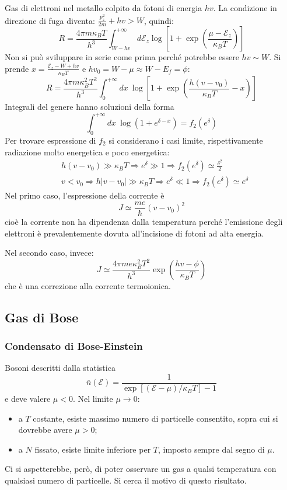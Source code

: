 \documentclass[10pt, a4paper]{scrartcl}
\numberwithin{equation}{subsection}
\theoremstyle{style1}
\begin{document}
Gas di elettroni nel metallo colpito da fotoni di energia $hv$. La condizione in direzione di fuga diventa: $\frac{p^2_z}{2m} + hv > W$, quindi:
\[
R = \frac{4 \pi m \kappa _B T}{h^3} \int_{W- hv} ^{+\infty}  d \mathscr{E}_z \log \left[ 1 + \exp \left(\frac{\mu - \mathscr{E}_z}{\kappa _B T}\right)  \right] 
\] 
Non si pu\`o sviluppare in serie come prima perch\'e potrebbe essere $hv \sim W$. Si prende $x = \frac{\mathscr{E}_z - W + hv}{\kappa _B T}$ e $hv_0 = W - \mu  \approx W - E_f = \phi $:
\[
R = \frac{4 \pi m \kappa _B^2 T^2}{h^3}  \int_{0} ^{+\infty} dx \ \log \left[ 1+ \exp \left(\frac{h(v-v_0)}{\kappa _B T} - x\right)  \right] 
\] 
Integrali del genere hanno soluzioni della forma
\[
\int_{0} ^{+\infty} dx \ \log \left(1 + e ^{ \delta  - x } \right) = f_2 (e^\delta )
\] 
Per trovare espressione di $f_2$ si considerano i casi limite, rispettivamente radiazione molto energetica e poco energetica:
\[
\begin{split}
	&h(v-v_0) \gg \kappa _B T \Rightarrow  e^\delta  \gg 1 \Rightarrow  f_2 (e^\delta ) \simeq \frac{\delta ^2}{2}\\
	& v< v_0 \Rightarrow  h|v-v_0| \gg \kappa _B T \Rightarrow e^\delta \ll 1 \Rightarrow  f_2 (e^\delta ) \simeq e^\delta 
\end{split}
\] 
Nel primo caso, l'espressione della corrente \`e 
\begin{equation}
	J \simeq \frac{me}{\hbar } (v-v_0)^2
\end{equation}
cio\`e la corrente non ha dipendenza dalla temperatura perch\'e l'emissione degli elettroni \`e prevalentemente dovuta all'incisione di fotoni ad alta energia.

Nel secondo caso, invece:
\begin{equation}
	J \simeq \frac{4 \pi m e \kappa _B^2 T^2}{h^3} \exp \left(\frac{hv - \phi }{\kappa _B T}\right) 
\end{equation}
che \`e una correzione alla corrente termoionica.
\subsection{Gas di Bose}
\subsubsection{Condensato di Bose-Einstein}
Bosoni descritti dalla statistica
\[
\overline{n} (\mathscr{E}) = \frac{1}{\exp\left[ (\mathscr{E}-\mu ) / \kappa _B T \right] - 1}
\] 
e deve valere $\mu  < 0$. Nel limite $\mu \to 0$:
\begin{itemize}
	\item a $T $ costante, esiste massimo numero di particelle consentito, sopra cui si dovrebbe avere $\mu >0$;
	\item a $N$ fissato, esiste limite inferiore per $T$, imposto sempre dal segno di $\mu $.
\end{itemize}
Ci si aspetterebbe, per\`o, di poter osservare un gas a qualsi temperatura con qualsiasi numero di particelle. 
Si cerca il motivo di questo risultato.
\end{document}
